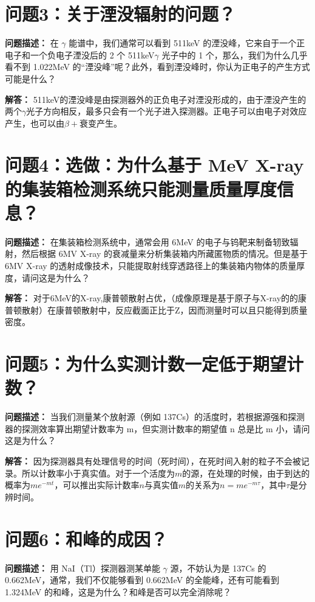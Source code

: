 \documentclass{article}
\begin{document}
\section{问题3：关于湮没辐射的问题？}
\label{sec:prob3}

\textbf{问题描述：} 在 $\gamma$ 能谱中，我们通常可以看到 511keV 的湮没峰，它来自于一个正电子和一个负电子湮没后的 2 个 511keV$\gamma$ 光子中的 1 个，那么，我们为什么几乎看不到 1.022MeV 的“湮没峰”呢？此外，看到湮没峰时，你认为正电子的产生方式可能是什么？

\textbf{解答：} 511keV的湮没峰是由探测器外的正负电子对湮没形成的，由于湮没产生的两个$\gamma$光子方向相反，最多只会有一个光子进入探测器。正电子可以由电子对效应产生，也可以由$\beta+$衰变产生。

\section{问题4：选做：为什么基于 MeV X-ray 的集装箱检测系统只能测量质量厚度信息？}
\label{sec:prob4}

\textbf{问题描述：} 在集装箱检测系统中，通常会用 6MeV 的电子与钨靶来制备轫致辐射，然后根据 6MV X-ray 的衰减量来分析集装箱内所藏匿物质的情况。但是基于 6MV X-ray 的透射成像技术，只能提取射线穿透路径上的集装箱内物体的质量厚度，请问这是为什么？

\textbf{解答：} 对于6MeV的X-ray,康普顿散射占优，（成像原理是基于原子与X-ray的的康普顿散射）在康普顿散射中，反应截面正比于Z，因而测量时可以且只能得到质量密度。

\section{问题5：为什么实测计数一定低于期望计数？}
\label{sec:prob5}

\textbf{问题描述：} 当我们测量某个放射源（例如 137Cs）的活度时，若根据源强和探测器的探测效率算出期望计数率为 m，但实测计数率的期望值 n 总是比 m 小，请问这是为什么？

\textbf{解答：} 因为探测器具有处理信号的时间（死时间），在死时间入射的粒子不会被记录。所以计数率小于真实值。对于一个活度为$m$的源，在处理的时候，由于到达的概率为$m e^{-mt}$，可以推出实际计数率$n$与真实值$m$的关系为$n=me^{-m\tau}$，其中$\tau$是分辨时间。

\section{问题6：和峰的成因？}
\label{sec:prob6}

\textbf{问题描述：} 用 NaI（Tl）探测器测某单能 $\gamma$ 源，不妨认为是 137Cs 的 0.662MeV，通常，我们不仅能够看到 0.662MeV 的全能峰，还有可能看到 1.324MeV 的和峰，这是为什么？和峰是否可以完全消除呢？
\end{document}
